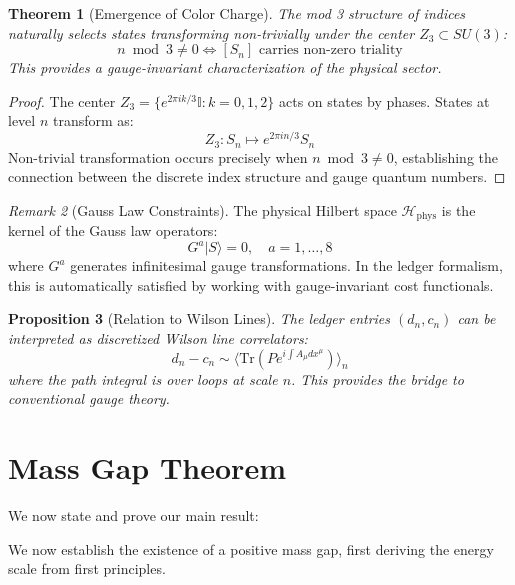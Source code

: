 \documentclass[11pt]{article}
\numberwithin{equation}{section}
\newtheorem{theorem}{Theorem}[section]
\newtheorem{proposition}[theorem]{Proposition}
\theoremstyle{definition}
\theoremstyle{remark}
\newtheorem{remark}[theorem]{Remark}
\begin{document}
\begin{theorem}[Emergence of Color Charge]
The mod 3 structure of indices naturally selects states transforming non-trivially under the center $Z_3 \subset SU(3)$:
\begin{equation}
n \bmod 3 \neq 0 \iff [S_n] \text{ carries non-zero triality}
\end{equation}
This provides a gauge-invariant characterization of the physical sector.
\end{theorem}

\begin{proof}
The center $Z_3 = \{e^{2\pi i k/3} \mathbb{I} : k = 0,1,2\}$ acts on states by phases. States at level $n$ transform as:
\begin{equation}
Z_3: S_n \mapsto e^{2\pi i n/3} S_n
\end{equation}
Non-trivial transformation occurs precisely when $n \bmod 3 \neq 0$, establishing the connection between the discrete index structure and gauge quantum numbers.
\end{proof}

\begin{remark}[Gauss Law Constraints]
The physical Hilbert space $\mathcal{H}_{\text{phys}}$ is the kernel of the Gauss law operators:
\begin{equation}
G^a |S\rangle = 0, \quad a = 1,\ldots,8
\end{equation}
where $G^a$ generates infinitesimal gauge transformations. In the ledger formalism, this is automatically satisfied by working with gauge-invariant cost functionals.
\end{remark}

\begin{proposition}[Relation to Wilson Lines]
The ledger entries $(d_n, c_n)$ can be interpreted as discretized Wilson line correlators:
\begin{equation}
d_n - c_n \sim \langle \text{Tr}(P e^{i\int A_\mu dx^\mu}) \rangle_n
\end{equation}
where the path integral is over loops at scale $n$. This provides the bridge to conventional gauge theory.
\end{proposition}

\section{Mass Gap Theorem}

We now state and prove our main result:

We now establish the existence of a positive mass gap, first deriving the energy scale from first principles.
\end{document}
